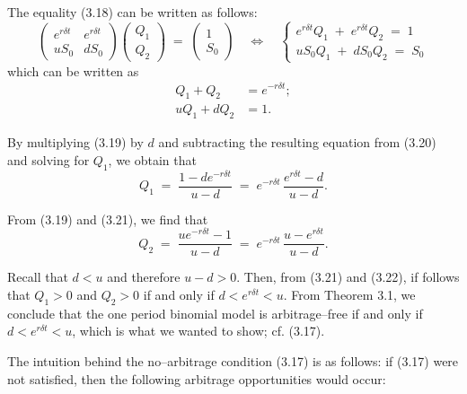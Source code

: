 The equality (3.18) can be written as follows:
\[
\begin{pmatrix} e^{r\delta t} & e^{r\delta t} \\ uS_0 & dS_0 \end{pmatrix}
\begin{pmatrix} Q_1 \\ Q_2 \end{pmatrix}
\;=\;
\begin{pmatrix} 1 \\ S_0 \end{pmatrix}
\quad\Longleftrightarrow\quad
\begin{cases}
e^{r\delta t} Q_1 \;+\; e^{r\delta t} Q_2 \;=\; 1 \\
uS_0 Q_1 \;+\; dS_0 Q_2 \;=\; S_0
\end{cases}
\]
which can be written as
\begin{align}
Q_1 + Q_2 &= e^{-r\delta t}; \\
uQ_1 + dQ_2 &= 1.
\end{align}

By multiplying (3.19) by $d$ and subtracting the resulting equation from
(3.20) and solving for $Q_1$, we obtain that
\begin{equation}
Q_1 \;=\; \frac{1 - de^{-r\delta t}}{u - d} \;=\; e^{-r\delta t}\,\frac{e^{r\delta t} - d}{u - d}.
\end{equation}

From (3.19) and (3.21), we find that
\begin{equation}
Q_2 \;=\; \frac{ue^{-r\delta t} - 1}{u - d} \;=\; e^{-r\delta t}\,\frac{u - e^{r\delta t}}{u - d}.
\end{equation}

Recall that $d < u$ and therefore $u - d > 0$. Then, from (3.21) and (3.22),
if follows that $Q_1 > 0$ and $Q_2 > 0$ if and only if $d < e^{r\delta t} <
u$. From Theorem 3.1, we conclude that the one period binomial model is
arbitrage--free if and only if $d < e^{r\delta t} < u$, which is what we
wanted to show; cf. (3.17).

The intuition behind the no--arbitrage condition (3.17) is as follows: if
(3.17) were not satisfied, then the following arbitrage opportunities would
occur:

